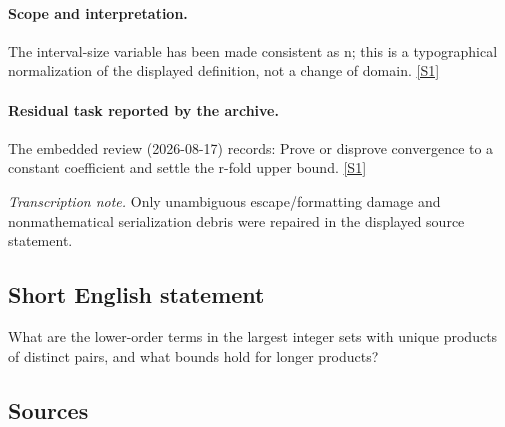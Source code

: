 \documentclass[11pt,a4paper]{article}
\newcommand{\sref}[2]{\hyperlink{source:#1:#2}{[S#2]}}
\begin{document}
\paragraph{Scope and interpretation.}

The interval-size variable has been made consistent as n; this is a typographical normalization of the displayed definition, not a change of domain. \sref{2114}{1}

\paragraph{Residual task reported by the archive.}

The embedded review (2026-08-17) records: Prove or disprove convergence to a constant coefficient and settle the r-fold upper bound. \sref{2114}{1}

{\small\emph{Transcription note.} Only unambiguous escape/formatting damage and nonmathematical serialization debris were repaired in the displayed source statement.}

\subsection{Short English statement}

What are the lower-order terms in the largest integer sets with unique products of distinct pairs, and what bounds hold for longer products?

\subsection{Sources}
\end{document}

